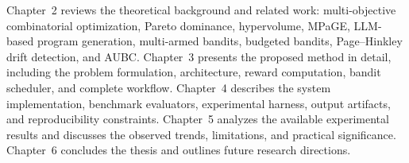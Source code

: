 \documentclass[../main.tex]{subfiles}
\begin{document}
Chapter~2 reviews the theoretical background and related work: multi-objective combinatorial optimization, Pareto dominance, hypervolume, MPaGE, LLM-based program generation, multi-armed bandits, budgeted bandits, Page--Hinkley drift detection, and AUBC. Chapter~3 presents the proposed \bmab{} method in detail, including the problem formulation, architecture, reward computation, bandit scheduler, and complete workflow. Chapter~4 describes the system implementation, benchmark evaluators, experimental harness, output artifacts, and reproducibility constraints. Chapter~5 analyzes the available experimental results and discusses the observed trends, limitations, and practical significance. Chapter~6 concludes the thesis and outlines future research directions.
\end{document}
